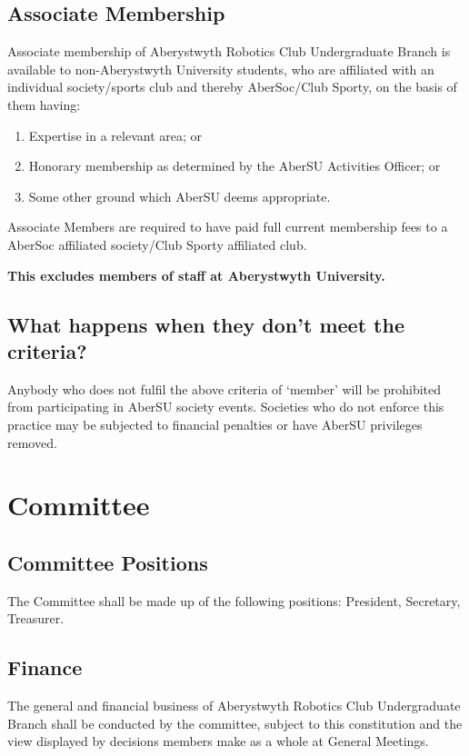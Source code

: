 \documentclass[a4paper,11pt]{article}
\begin{document}
\subsection{Associate Membership}
Associate membership of Aberystwyth Robotics Club Undergraduate Branch is available to non-Aberystwyth University students, who are affiliated with an individual society/sports club and thereby AberSoc/Club Sporty, on the basis of them having:
\begin{enumerate}[nolistsep]
  \item Expertise in a relevant area; or
  \item Honorary membership as determined by the AberSU Activities Officer; or
  \item Some other ground which AberSU deems appropriate.
\end{enumerate}
Associate Members are required to have paid full current membership fees to a AberSoc affiliated society/Club Sporty affiliated club.
\begin{center}
\textbf{This excludes members of staff at Aberystwyth University.}
\end{center}

\subsection{What happens when they don't meet the criteria?}
Anybody who does not fulfil the above criteria of `member' will be prohibited from participating in AberSU society events. Societies who do not enforce this practice may be subjected to financial penalties or have AberSU privileges removed.

\section{Committee}
\subsection{Committee Positions}
The Committee shall be made up of the following positions: President, Secretary, Treasurer.

\subsection{Finance}
The general and financial business of Aberystwyth Robotics Club Undergraduate Branch shall be conducted by the committee, subject to this constitution and the view displayed by decisions members make as a whole at General Meetings.
\end{document}

